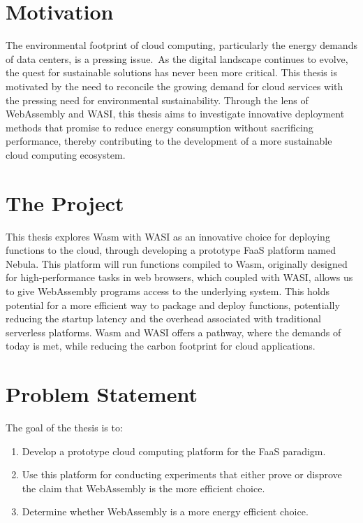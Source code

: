 \documentclass[
  table]{report}
\providecommand{\tightlist}{%
  \setlength{\itemsep}{0pt}\setlength{\parskip}{0pt}}
\begin{document}
\section{Motivation}
\label{sect:motivation}

The environmental footprint of cloud computing, particularly the energy
demands of data centers, is a pressing issue.~As the digital landscape
continues to evolve, the quest for sustainable solutions has never been
more critical. This thesis is motivated by the need to reconcile the
growing demand for cloud services with the pressing need for
environmental sustainability. Through the lens of WebAssembly and
\ac{WASI}, this thesis aims to investigate innovative deployment methods
that promise to reduce energy consumption without sacrificing
performance, thereby contributing to the development of a more
sustainable cloud computing ecosystem.

\section{The Project}
\label{sect:project}

This thesis explores \ac{Wasm} with \ac{WASI} as an innovative choice
for deploying functions to the cloud, through developing a prototype
\ac{FaaS} platform named Nebula. This platform will run functions
compiled to \ac{Wasm}, originally designed for high-performance tasks in
web browsers, which coupled with \ac{WASI}, allows us to give
WebAssembly programs access to the underlying system. This holds
potential for a more efficient way to package and deploy functions,
potentially reducing the startup latency and the overhead associated
with traditional serverless platforms. \ac{Wasm} and \ac{WASI} offers a
pathway, where the demands of today is met, while reducing the carbon
footprint for cloud applications.

\section{Problem Statement}
\label{sect:problems}


The goal of the thesis is to:

\begin{enumerate}
\def\labelenumi{\arabic{enumi}.}
\tightlist
\item
  Develop a prototype cloud computing platform for the \ac{FaaS}
  paradigm.
\item
  Use this platform for conducting experiments that either prove or
  disprove the claim that WebAssembly is the more efficient choice.
\item
  Determine whether WebAssembly is a more energy efficient choice.
\end{enumerate}
\end{document}

